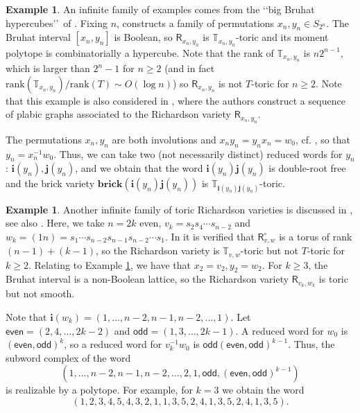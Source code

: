 \documentclass[a4paper, 11pt]{amsart}
\newcommand{\brick}{\mathbf{brick}}
\newcommand{\orich}[1]{\mathsf{R}^{\circ}_{#1}}
\newcommand{\rich}[1]{\mathsf{R}_{#1}}
\newcommand{\word}[1]{\mathbf{#1}}
\newcommand{\wo}{w_{0}}
\newcommand{\rank}{\mathrm{rank}}
\newcommand{\dil}[1]{\mathbb{T}_{#1}}
\theoremstyle{definition}
\newtheorem{example}[theorem]{Example}
\begin{document}
\begin{example}\label{ex:hypercubes}
An infinite family of examples comes from the \lq\lq big Bruhat hypercubes\rq\rq \, of \cite{hypercubes}. Fixing $n$, \cite{hypercubes} constructs a family of permutations $x_n, y_n \in S_{2^{n}}$. The Bruhat interval $[x_n, y_n]$ is Boolean, so $\rich{x_n, y_n}$ is $\dil{x_n, y_n}$-toric and its moment polytope is combinatorially a hypercube. Note that the rank of $\dil{x_n, y_n}$ is $n2^{n-1}$, which is larger than $2^{n}-1$ for $n \geq 2$ (and in fact $\rank(\dil{x_n, y_n})/\rank(T) \sim O(\log n)$) so $\rich{x_n, y_n}$ is not $T$-toric for $n \geq 2$.  Note that this example is also considered in \cite[Section 5.3]{GKSB}, where the authors construct a sequence of plabic graphs associated to the Richardson variety $\rich{x_n, y_n}$. 

The permutations $x_n, y_n$ are both involutions and $x_ny_n = y_nx_n = \wo$, cf. \cite[Lemma 2.8]{hypercubes}, so that $y_n = x_n^{-1}\wo$. Thus, we can take two (not necessarily distinct) reduced words for $y_n$: $\word{i}(y_n), \word{j}(y_n)$, and we obtain that the word $\word{i}(y_n)\word{j}(y_n)$ is double-root free and the brick variety $\brick(\word{i}(y_n)\word{j}(y_n))$ is $\dil{\word{i}(y_n)\word{j}(y_n)}$-toric.
\end{example}



\begin{example}
\label{ex:even_odd}
Another infinite family of toric Richardson varieties is discussed in \cite[Section 5.2]{GKSB}, see also \cite[Remark 5.18]{splicing2}. Here, we take $n = 2k$ even, $v_k = s_2s_4\cdots s_{n-2}$ and $w_k = (1n) = s_1\cdots s_{n-2}s_{n-1}s_{n-2}\cdots s_{1}$. In \cite[Remark 5.18]{splicing2} it is verified that $\orich{v, w}$ is a torus of rank $(n-1)+ (k-1)$, so the Richardson variety is $\dil{v,w}$-toric but not $T$-toric for $k \geq 2$.  Relating to Example \ref{ex:hypercubes}, we have that $x_2 = v_2, y_2 = w_2$. For $k \geq 3$, the Bruhat interval is a non-Boolean lattice, so the Richardson variety $\rich{v_k, w_k}$ is toric but not smooth. 

Note that $\word{i}(w_k) = (1,\dots, n-2, n-1, n-2, \dots, 1)$. Let $\mathsf{even} = (2,4,\dots, 2k-2)$ and $\mathsf{odd} = (1, 3, \dots, 2k-1)$. A reduced word for $\wo$ is $(\mathsf{even},\mathsf{odd})^{k}$, so a reduced word for $v_k^{-1}\wo$ is $\mathsf{odd}(\mathsf{even},\mathsf{odd})^{k-1}$. Thus, the subword complex of the word
\[
(1, \dots, n-2, n-1, n-2, \dots, 2, 1, \mathsf{odd}, (\mathsf{even}, \mathsf{odd})^{k-1}) 
\]
is realizable by a polytope. For example, for $k = 3$ we obtain the word
\[
(1,2,3,4,5,4,3,2,1,1,3,5,2,4,1,3,5,2,4,1,3,5).
\]
\end{example}
\end{document}
